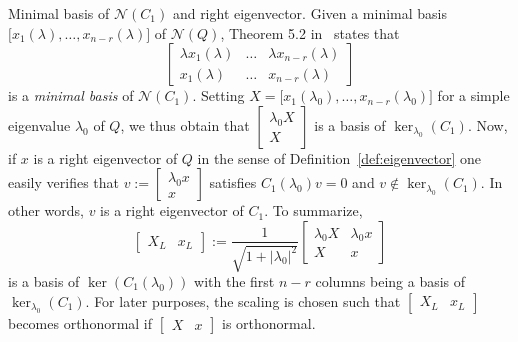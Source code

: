 \documentclass[12pt]{article}
\begin{document}
\begin{paragraph}{Minimal basis of $\mathcal{N}(C_1)$ and right eigenvector.}
Given 
a minimal basis $\big[ x_1(\lambda),\ldots,x_{n-r}(\lambda)\big]$ of $\mathcal{N}(Q)$, Theorem 5.2 in~\cite{de2009linearizations} states that
\[
\begin{bmatrix}
 \lambda x_1(\lambda) & \ldots & \lambda x_{n-r}(\lambda) \\
 x_1(\lambda) & \ldots & x_{n-r}(\lambda) 
\end{bmatrix}
\]
is a \emph{minimal basis} of $\mathcal{N}(C_1)$. Setting $X = \big[ x_1(\lambda_0),\ldots,x_{n-r}(\lambda_0)\big]$ for a simple eigenvalue $\lambda_0$ of $Q$, we thus obtain that $\begin{bmatrix} \lambda_0 X \\ X \end{bmatrix}$ is a basis of $\ker_{\lambda_0}(C_1)$. Now, if $x$ is a right eigenvector of $Q$ in the sense of Definition~\ref{def:eigenvector} one easily verifies that $v := \begin{bmatrix} \lambda_0 x \\ x \end{bmatrix}$
satisfies $C_1(\lambda_0) v = 0$ and $v \not\in \ker_{\lambda_0}(C_1)$. In other words, $v$ is a right eigenvector of $C_1$. To summarize,
\begin{equation}\label{eq:rightC1norm1}
    \begin{bmatrix}  X_L & x_L \end{bmatrix} := \frac{1}{\sqrt{1+|\lambda_0|^2}} \begin{bmatrix} \lambda_0 X & \lambda_0 x \\
    X  & x \end{bmatrix}
\end{equation}
is a basis of $\ker(C_1(\lambda_0))$ with the first $n-r$ columns being a basis of $\ker_{\lambda_0}(C_1)$. For later purposes, the scaling is chosen such that $\begin{bmatrix}  X_L & x_L \end{bmatrix}$ becomes orthonormal if 
$\begin{bmatrix} X  & x \end{bmatrix}$ is orthonormal.
\end{paragraph}
\end{document}
